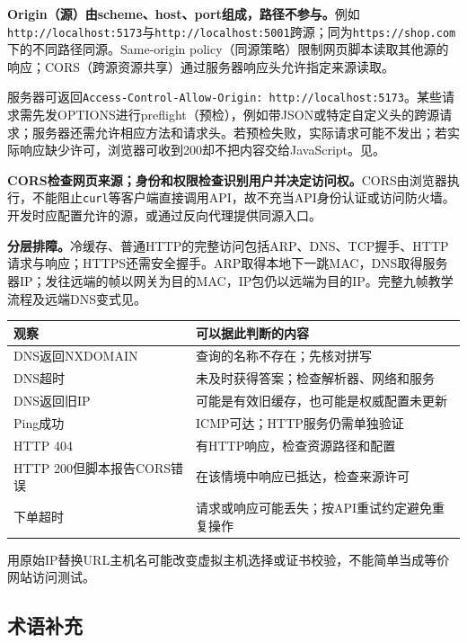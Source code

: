 
\textbf{Origin（源）由scheme、host、port组成，路径不参与。}例如\texttt{http://localhost:5173}与\texttt{http://localhost:5001}跨源；同为\texttt{https://shop.com}下的不同路径同源。Same-origin policy（同源策略）限制网页脚本读取其他源的响应；CORS（跨源资源共享）通过服务器响应头允许指定来源读取。

服务器可返回\texttt{Access-Control-Allow-Origin: http://localhost:5173}。某些请求需先发OPTIONS进行preflight（预检），例如带JSON或特定自定义头的跨源请求；服务器还需允许相应方法和请求头。若预检失败，实际请求可能不发出；若实际响应缺少许可，浏览器可收到200却不把内容交给JavaScript。见。

\textbf{CORS检查网页来源；身份和权限检查识别用户并决定访问权。}CORS由浏览器执行，不能阻止\texttt{curl}等客户端直接调用API，故不充当API身份认证或访问防火墙。开发时应配置允许的源，或通过反向代理提供同源入口。

\textbf{分层排障。}冷缓存、普通HTTP的完整访问包括ARP、DNS、TCP握手、HTTP请求与响应；HTTPS还需安全握手。ARP取得本地下一跳MAC，DNS取得服务器IP；发往远端的帧以网关为目的MAC，IP包仍以远端为目的IP。完整九帧教学流程及远端DNS变式见。

\begin{center}
\small
\begin{tabularx}{\textwidth}{@{}>{\raggedright\arraybackslash}p{4.4cm}X@{}}
\toprule
观察 & 可以据此判断的内容 \\
\midrule
DNS返回NXDOMAIN & 查询的名称不存在；先核对拼写 \\
DNS超时 & 未及时获得答案；检查解析器、网络和服务 \\
DNS返回旧IP & 可能是有效旧缓存，也可能是权威配置未更新 \\
Ping成功 & ICMP可达；HTTP服务仍需单独验证 \\
HTTP 404 & 有HTTP响应，检查资源路径和配置 \\
HTTP 200但脚本报告CORS错误 & 在该情境中响应已抵达，检查来源许可 \\
下单超时 & 请求或响应可能丢失；按API重试约定避免重复操作 \\
\bottomrule
\end{tabularx}
\end{center}
用原始IP替换URL主机名可能改变虚拟主机选择或证书校验，不能简单当成等价网站访问测试。

\subsection{术语补充}

